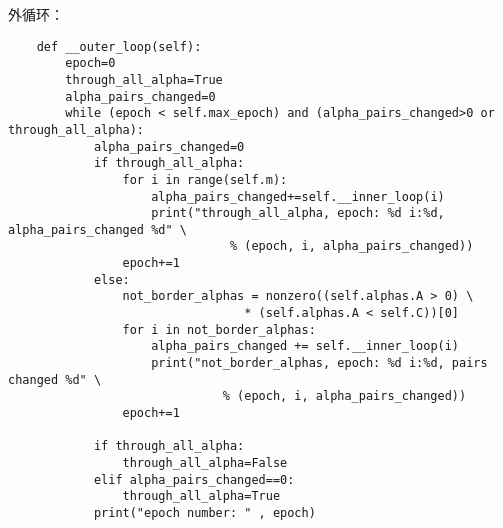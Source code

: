 \documentclass[UTF8]{ctexart}
\begin{document}
外循环：
\begin{verbatim}
    def __outer_loop(self):
        epoch=0
        through_all_alpha=True
        alpha_pairs_changed=0
        while (epoch < self.max_epoch) and (alpha_pairs_changed>0 or through_all_alpha):
            alpha_pairs_changed=0
            if through_all_alpha:
                for i in range(self.m):
                    alpha_pairs_changed+=self.__inner_loop(i)
                    print("through_all_alpha, epoch: %d i:%d, alpha_pairs_changed %d" \ 
                               % (epoch, i, alpha_pairs_changed))
                epoch+=1
            else:
                not_border_alphas = nonzero((self.alphas.A > 0) \ 
                                 * (self.alphas.A < self.C))[0]
                for i in not_border_alphas:
                    alpha_pairs_changed += self.__inner_loop(i)
                    print("not_border_alphas, epoch: %d i:%d, pairs changed %d" \ 
                              % (epoch, i, alpha_pairs_changed))
                epoch+=1

            if through_all_alpha:
                through_all_alpha=False
            elif alpha_pairs_changed==0:
                through_all_alpha=True
            print("epoch number: " , epoch)
\end{verbatim}
\end{document}
